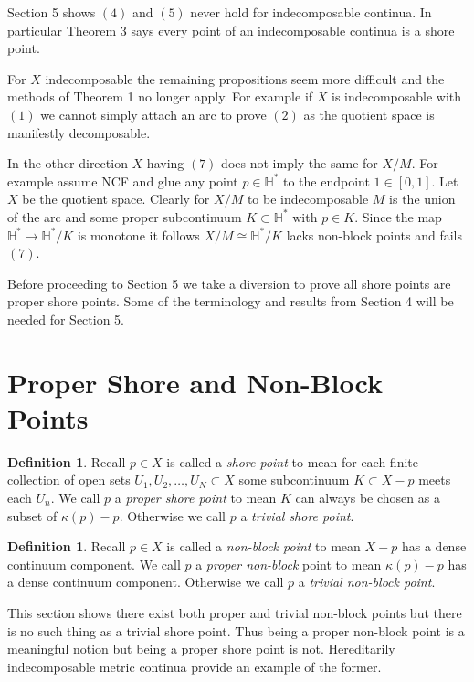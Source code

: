 \documentclass[12pt]{article}
\theoremstyle{plain}
\theoremstyle{definition}
\newtheorem{definition}[theorem]{Definition}
\newcommand{\K}{\ensuremath{\kappa}}
\newcommand{\HH}{\ensuremath{\mathbb H}}
\newcommand{\0}{\ensuremath{\varnothing}}
\begin{document}
Section 5 shows $(4)$ and $(5)$ never hold for indecomposable continua.
In particular Theorem 3 says every point of an indecomposable continua is a shore point.

For $X$ indecomposable the remaining propositions seem more difficult and the methods of Theorem 1 no longer apply.
For example if $X$ is indecomposable with $(1)$ we cannot simply attach an arc to prove $(2)$ 
as the quotient space is manifestly decomposable.

In the other direction $X$ having $(7)$ does not imply the same for $X/M$.
For example assume NCF and glue any point $p \in \HH^*$ to the endpoint $1 \in [0,1]$.
Let $X$ be the quotient space.
Clearly for $X/M$ to be indecomposable $M$ is the union of the arc and some proper subcontinuum $K \subset \HH^*$ with $p \in K$.
Since the map $\HH^* \to \HH^*/K$ is monotone it follows $X/M \cong \HH^*/K$ lacks non-block points and fails $(7)$.

Before proceeding to Section 5 we take a diversion to prove all shore points are proper shore points.
Some of the terminology and results from Section 4 will be needed for Section 5.

\section{Proper Shore and Non-Block Points}

\begin{definition}
Recall $p \in X$ is called a \textit{shore point} to mean for each finite collection of open sets $U_1,U_2, \ldots , U_N \subset X$
some subcontinuum $K \subset X-p$ meets each $U_n$.
We call $p$ a \textit{proper shore point} to mean $K$ can always be chosen as a subset of $\K(p)-p$.
Otherwise we call $p$ a \textit{trivial shore point}.
\end{definition}


\begin{definition}
Recall $p \in X$ is called a \textit{non-block point} to mean $X-p$ has a dense continuum component.
We call $p$ a \textit{proper non-block} point to mean $\K(p)-p$ has a dense continuum component.
Otherwise we call $p$ a \textit{trivial non-block point}.
\end{definition}

This section shows there exist both proper and trivial non-block points but there is no such thing as a trivial shore point. Thus being a proper non-block point is a meaningful notion but being a proper shore point is not.
Hereditarily indecomposable metric continua provide an example of the former.
\end{document}

